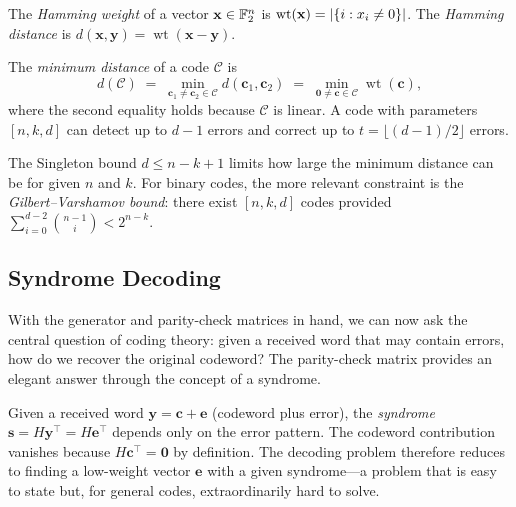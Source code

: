 \begin{definition}
\label{def:hamming}
The \emph{Hamming weight} of a vector $\mathbf{x} \in \mathbb{F}_2^n$ is $\operatorname{wt}(\mathbf{x}) = \left\lvert \{i : x_i \neq 0\} \right\rvert$.  The \emph{Hamming distance} is $d(\mathbf{x}, \mathbf{y}) = \operatorname{wt}(\mathbf{x} - \mathbf{y})$.
\end{definition}

\begin{definition}
\label{def:min-distance}
The \emph{minimum distance} of a code $\mathcal{C}$ is
\begin{equation}
d(\mathcal{C}) \;=\; \min_{\mathbf{c}_1 \neq \mathbf{c}_2 \in \mathcal{C}} d(\mathbf{c}_1, \mathbf{c}_2) \;=\; \min_{\mathbf{0} \neq \mathbf{c} \in \mathcal{C}} \operatorname{wt}(\mathbf{c}),
\end{equation}
where the second equality holds because $\mathcal{C}$ is linear.  A code with parameters $[n, k, d]$ can detect up to $d-1$ errors and correct up to $t = \lfloor(d-1)/2\rfloor$ errors.
\end{definition}

The Singleton bound $d \leq n - k + 1$ limits how large the minimum distance can be for given $n$ and $k$.  For binary codes, the more relevant constraint is the \emph{Gilbert--Varshamov bound}: there exist $[n, k, d]$ codes provided $\sum_{i=0}^{d-2}\binom{n-1}{i} < 2^{n-k}$.


\subsection{Syndrome Decoding}
\label{subsec:syndrome-decoding}

With the generator and parity-check matrices in hand, we can now ask the central question of coding theory: given a received word that may contain errors, how do we recover the original codeword?  The parity-check matrix provides an elegant answer through the concept of a syndrome.

Given a received word $\mathbf{y} = \mathbf{c} + \mathbf{e}$ (codeword plus error), the \emph{syndrome} $\mathbf{s} = H\mathbf{y}^\top = H\mathbf{e}^\top$ depends only on the error pattern.  The codeword contribution vanishes because $H\mathbf{c}^\top = \mathbf{0}$ by definition.  The decoding problem therefore reduces to finding a low-weight vector $\mathbf{e}$ with a given syndrome---a problem that is easy to state but, for general codes, extraordinarily hard to solve.

